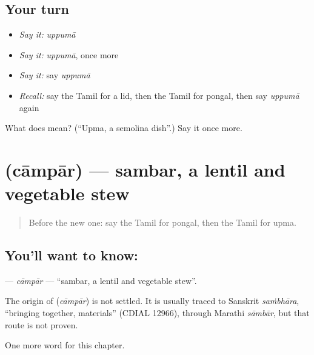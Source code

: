 \subsection*{Your turn}
\begin{itemize}
\raggedright
  \item \emph{Say it:} \emph{uppumā}
  \item \emph{Say it:} \emph{uppumā}, once more
  \item \emph{Say it:} say \emph{uppumā}
  \item \emph{Recall:} say the Tamil for a lid, then the Tamil for pongal, then say \emph{uppumā} again
\end{itemize}

\begin{tcolorbox}[breakable,colback=teal!4,colframe=teal!35!black,title={Before you move on}]
What does  mean? (\textquotedblleft{}Upma, a semolina dish\textquotedblright{}.) Say it once more.
\end{tcolorbox}
\section[\texorpdfstring{\ta{சாம்பார்} (cāmpār)}{சாம்பார் (cāmpār)}]{ (cāmpār) — sambar, a lentil and vegetable stew}

\label{lesson:TA-C183-campar}



\begin{quote}
Before the new one: say the Tamil for pongal, then the Tamil for upma.
\end{quote}

\subsection*{You'll want to know: }
\textbf{} — \emph{cāmpār} — \textquotedblleft{}sambar, a lentil and vegetable stew\textquotedblright{}.

\begin{cousinweb}
The origin of \textbf{} (\emph{cāmpār}) is not settled. It is usually traced to Sanskrit \emph{saṁbhāra}, \textquotedblleft{}bringing together, materials\textquotedblright{} (CDIAL 12966), through Marathi \emph{sāmbār}, but that route is not proven.
\end{cousinweb}

\begin{grammarlens}[title={What you've built}]
One more word for this chapter.
\end{grammarlens}

